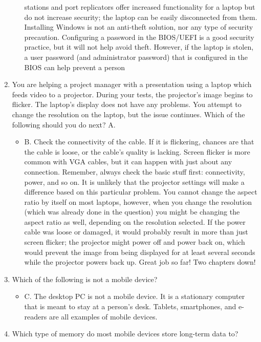 \documentclass{article}
\begin{document}
\begin{enumerate}
\begin{itemize}
stations and port replicators offer increased
functionality for a laptop but do not increase
security; the laptop can be easily disconnected
from them. Installing Windows is not an anti-theft
solution, nor any type of security precaution.
Configuring a password in the BIOS/UEFI is a
good security practice, but it will not help avoid
theft. However, if the laptop is stolen, a user
password (and administrator password) that is
configured in the BIOS can help prevent a person
    \end{itemize}
    \item You are helping a project manager with a
presentation using a laptop which feeds video to a
projector. During your tests, the projector’s image
begins to flicker. The laptop’s display does not
have any problems. You attempt to change the
resolution on the laptop, but the issue continues.
Which of the following should you do next?
A.
    \begin{itemize}
        \item B. Check the connectivity of the cable. If it is
flickering, chances are that the cable is loose, or
the cable’s quality is lacking. Screen flicker is
more common with VGA cables, but it can happen
with just about any connection. Remember,
always check the basic stuff first: connectivity,
power, and so on. It is unlikely that the projector
settings will make a difference based on this
particular problem. You cannot change the aspect
ratio by itself on most laptops, however, when you
change the resolution (which was already done in
the question) you might be changing the aspect
ratio as well, depending on the resolution
selected. If the power cable was loose or damaged,
it would probably result in more than just screen
flicker; the projector might power off and power
back on, which would prevent the image from
being displayed for at least several seconds while
the projector powers back up. Great job so far!
Two chapters down!
    \end{itemize}
    \item Which of the following is not a mobile device?
    \begin{itemize}
        \item C. The desktop PC is not a mobile device. It is a stationary
computer that is meant to stay at a person’s desk. Tablets,
smartphones, and e-readers are all examples of mobile devices.
    \end{itemize}
    \item Which type of memory do most mobile devices store long-term
data to?

\end{enumerate}
\end{document}
